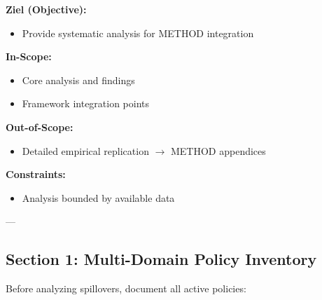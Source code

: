 \begin{abstract}
This appendix provides systematic analysis and documentation relevant to the
Evidence-Based Framework (EBF). It integrates with the 10C CORE architecture
and provides validated findings for practical application.
\end{abstract}

\begin{tcolorbox}[
    colback=orange!5!white,
    colframe=orange!75!black,
    title={\textbf{Appendix Scope: Ziel / In-Scope / Out-of-Scope / Constraints}},
    fonttitle=\bfseries
]

\textbf{Ziel (Objective):}
\begin{itemize}[nosep]
    \item Provide systematic analysis for METHOD integration
\end{itemize}

\textbf{In-Scope:}
\begin{itemize}[nosep]
    \item Core analysis and findings
    \item Framework integration points
\end{itemize}

\textbf{Out-of-Scope:}
\begin{itemize}[nosep]
    \item Detailed empirical replication $\rightarrow$ METHOD appendices
\end{itemize}

\textbf{Constraints:}
\begin{itemize}[nosep]
    \item Analysis bounded by available data
\end{itemize}

\end{tcolorbox}

---


\subsection*{Section 1: Multi-Domain Policy Inventory}

Before analyzing spillovers, document all active policies:


